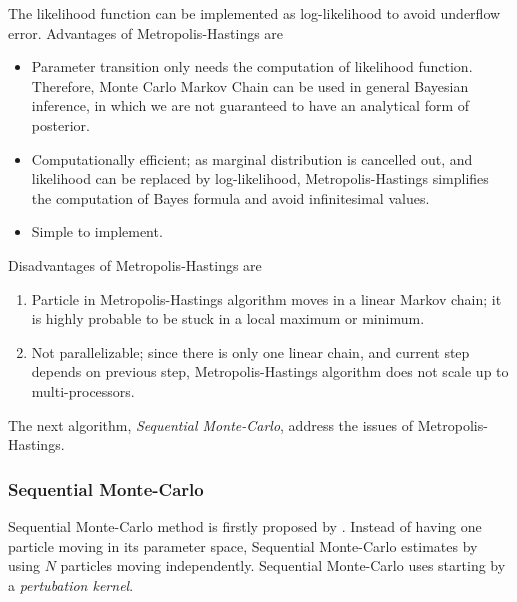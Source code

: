 The likelihood function can be implemented as log-likelihood to avoid underflow error.
Advantages of Metropolis-Hastings are
\begin{itemize}
    \item Parameter transition only needs the computation of likelihood function.
          Therefore, Monte Carlo Markov Chain can be used in general Bayesian inference,
          in which we are not guaranteed to have an analytical form of posterior.
    \item Computationally efficient; as marginal distribution is cancelled out, and likelihood can
          be replaced by log-likelihood, Metropolis-Hastings simplifies the computation of Bayes formula
          and avoid infinitesimal values.
    \item Simple to implement.
\end{itemize}
Disadvantages of Metropolis-Hastings are
\begin{enumerate}
    \item Particle in Metropolis-Hastings algorithm moves in a linear Markov chain; it is highly
          probable to be stuck in a local maximum or minimum.
    \item Not parallelizable; since there is only one linear chain, and current step depends on
          previous step, Metropolis-Hastings algorithm does not scale up to multi-processors.
\end{enumerate}
The next algorithm, \textit{Sequential Monte-Carlo}, address the issues of Metropolis-Hastings.

\subsubsection{Sequential Monte-Carlo}
Sequential Monte-Carlo method is firstly proposed by \cite{del2006sequential}.  Instead of having
one particle moving in its parameter space, Sequential Monte-Carlo estimates by using $N$ particles
moving independently. Sequential Monte-Carlo uses  starting by a \textit{pertubation kernel}.

